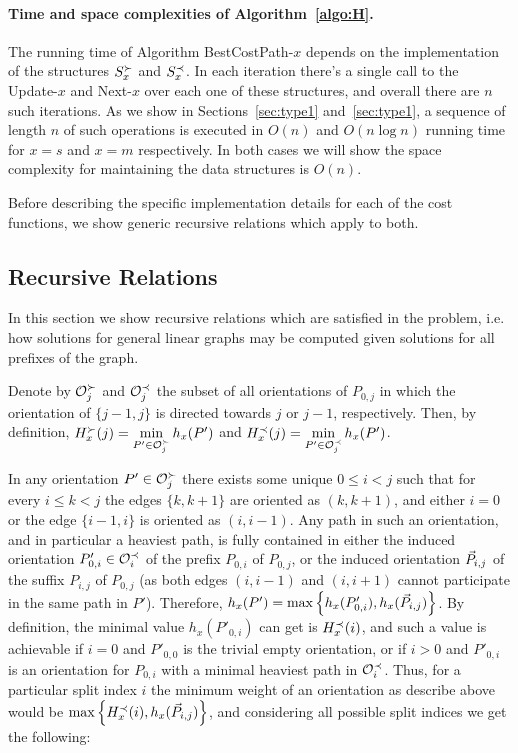 \paragraph{Time and space complexities of Algorithm~\ref{algo:H}.}
The running time of Algorithm BestCostPath-$x$ depends on the implementation of the structures $S^\succ_x$ and $S^\prec_x$. In each iteration there's a single call to the Update-$x$ and Next-$x$ over each one of these structures, and overall there are $n$ such iterations. As we show in Sections~\ref{sec:type1} and~\ref{sec:type1}, a sequence of length $n$ of such operations is executed in $O(n)$ and $O(n \log n)$ running time for $x = s$ and $x = m$ respectively. In both cases we will show the space complexity for maintaining the data structures is $O(n)$.

Before describing the specific implementation details for each of the cost functions, we show generic recursive relations which apply to both.

\subsection{Recursive Relations}

In this section we show recursive relations which are satisfied in the problem, i.e. how solutions for general linear graphs may be computed given solutions for all prefixes of the graph. 

Denote by $\mathcal{O}^\succ_j$ and $\mathcal{O}^\prec_j$ the subset of all orientations of $P_{0, j}$ in which the orientation of $\{j-1, j\}$ is directed towards $j$ or $j-1$, respectively. Then, by definition, $H^\succ_x(j) = \min\limits_{P' \in \mathcal{O}^\succ_j} h_x(P')$ and $H^\prec_x(j) = \min\limits_{P' \in \mathcal{O}^\prec_j} h_x(P')$. 

In any orientation $P' \in \mathcal{O}^\succ_j$ there exists some unique $0 \leq i < j$ such that for every $i \leq k < j$ the edges $\{k, k+1\}$ are oriented as $(k, k+1)$, and either $i = 0$ or the edge $\{i-1, i\}$ is oriented as $(i, i-1)$. Any path in such an orientation, and in particular a heaviest path, is fully contained in either the induced orientation $P'_{0, i} \in \mathcal{O}^\prec_i$ of the prefix $P_{0, i}$ of $P_{0, j}$, or the induced orientation $\vec{P}_{i, j}$ of the suffix $P_{i, j}$ of $P_{0, j}$ (as both edges $(i, i-1)$ and $(i, i+1)$ cannot participate in the same path in $P'$). Therefore, $h_x(P') = \max \left\{h_x(P'_{0, i}), h_x(\vec{P}_{i, j})\right\}$. By definition, the minimal value $h_x(P'_{0, i})$ can get is $H^\prec_x(i)$, and such a value is achievable if $i = 0$ and $P'_{0, 0}$ is the trivial empty orientation, or if $i > 0$ and $P'_{0, i}$ is an orientation for $P_{0, i}$ with a minimal heaviest path in $\mathcal{O}^\prec_i$. Thus, for a particular split index $i$ the minimum weight of an orientation as describe above would be $\max\left\{H^\prec_x(i), h_x(\vec{P}_{i, j})\right\}$, and considering all possible split indices we get the following:

